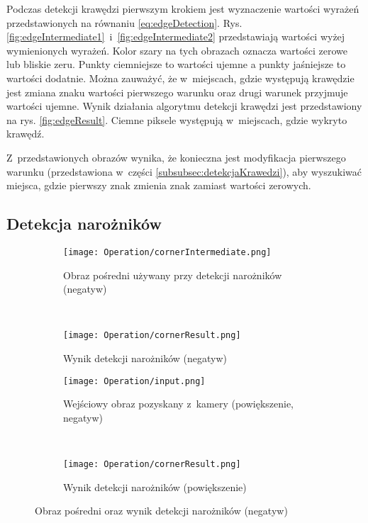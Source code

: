 Podczas detekcji krawędzi pierwszym krokiem jest wyznaczenie wartości wyrażeń przedstawionych na równaniu \eqref{eq:edgeDetection}. Rys. \ref{fig:edgeIntermediate1}~i~\ref{fig:edgeIntermediate2} przedstawiają wartości wyżej wymienionych wyrażeń. Kolor szary na tych obrazach oznacza wartości zerowe lub bliskie zeru. Punkty ciemniejsze to wartości ujemne a punkty jaśniejsze to wartości dodatnie. Można zauważyć, że w~miejscach, gdzie występują krawędzie jest zmiana znaku wartości pierwszego warunku oraz drugi warunek przyjmuje wartości ujemne. Wynik działania algorytmu detekcji krawędzi jest przedstawiony na rys. \ref{fig:edgeResult}. Ciemne piksele występują w~miejscach, gdzie wykryto krawędź.

Z~przedstawionych obrazów wynika, że konieczna jest modyfikacja pierwszego warunku (przedstawiona w~części \ref{subsubsec:detekcjaKrawedzi}), aby wyszukiwać miejsca, gdzie pierwszy znak zmienia znak zamiast wartości zerowych.

\subsection{Detekcja narożników}
\label{sec:dzialanieCorner}

\begin{figure}[h]
\begin{center}

\begin{subfigure}[t]{0.3\textwidth}
\texttt{[image: Operation/cornerIntermediate.png]}
\caption{Obraz pośredni używany przy detekcji narożników (negatyw)}
\label{fig:cornerIntermediate}
\end{subfigure}
~
\begin{subfigure}[t]{0.3\textwidth}
\texttt{[image: Operation/cornerResult.png]}
\caption{Wynik detekcji narożników (negatyw)}
\label{fig:cornerResult}
\end{subfigure}

\begin{subfigure}[t]{0.3\textwidth}
\texttt{[image: Operation/input.png]}
\caption{Wejściowy obraz pozyskany z~kamery (powiększenie, negatyw)}
\label{fig:inputCornerZoom}
\end{subfigure}
~
\begin{subfigure}[t]{0.3\textwidth}
\texttt{[image: Operation/cornerResult.png]}
\caption{Wynik detekcji narożników (powiększenie)}
\label{fig:cornerResultZoom}
\end{subfigure}

\end{center}
\label{fig:showEdge}
\caption{Obraz pośredni oraz wynik detekcji narożników (negatyw)}
\end{figure}

